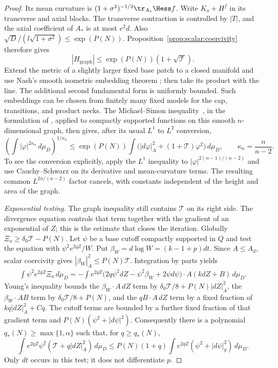 \begin{proof}
Its mean curvature is
$(1+\sigma^2)^{-1/2}\tr_{A_*}\Hess f$.  Write
$K_a+H^f$ in its transverse and axial blocks.  The transverse
contraction is controlled by $|T|$, and the axial coefficient of
$A_*$ is at most $e^2d$.  Also
$\sqrt D/(l\sqrt{1+\sigma^2})\le\exp(P(N))$.
Proposition~\ref{prop:scalar:coercivity} therefore gives
\[
 |H_{\mathrm{graph}}|\le\exp(P(N))(1+\sqrt{\mathcal T}).
\]
Extend the metric of a slightly larger fixed base patch to a closed
manifold and use Nash's smooth isometric embedding theorem
\cite{Nash1956}; then take its product with the line.  The additional second
fundamental form is uniformly bounded.  Such embeddings can be chosen
from finitely many fixed models for the cap, transitions, and product
necks. The Michael--Simon inequality~\cite{MichaelSimon1973}, in the
formulation of \cite[Chapter~4, Section~6, Theorem~6.7]{SimonGMT},
applied to compactly supported functions on this smooth $n$-dimensional graph,
then gives, after its usual $L^1$ to $L^2$ conversion,
\begin{equation}\label{eq:elliptic:graph-sobolev}
 \left(\int |\varphi|^{2\kappa_n}\,d\mu_D\right)^{1/\kappa_n}
 \le\exp(P(N))\int
       \bigl(|d\varphi|_A^2+(1+\mathcal T)\varphi^2\bigr)\,d\mu_D,
 \qquad \kappa_n=\frac n{n-2}.
\end{equation}
To see the conversion explicitly, apply the $L^1$ inequality to
$|\varphi|^{2(n-1)/(n-2)}$ and use Cauchy--Schwarz on its derivative
and mean-curvature terms.  The resulting common
$L^{2n/(n-2)}$ factor cancels, with constants independent of the
height and area of the graph.

\medskip\noindent\emph{Exponential testing.}
The graph inequality still contains $\mathcal T$ on its right side.
The divergence equation controls that term together with the gradient
of an exponential of $Z$; this is the estimate that closes the iteration.
Globally $\Xi_a\ge\delta_0\mathcal T-P(N)$.
Let $\psi$ be a base cutoff compactly supported in $Q$ and test the
equation with $\psi^2e^{2qZ}/W$.  Put
$\beta_W=d\log W=(k-1+p)dt$.
Since $A\le A_d$, scalar coercivity gives
$|\beta_W|_A^2\le P(N)\mathcal T$.
Integration by parts yields
\begin{align*}
 \int \psi^2e^{2qZ}\Xi_a\,d\mu_D
 =-\int e^{2qZ}
  \bigl(2q\psi^2dZ-\psi^2\beta_W+2\psi d\psi\bigr)
                   \cdot A(kdZ+B)\,d\mu_D.
\end{align*}
Young's inequality bounds the $\beta_W\cdot A\,dZ$ term by
$\delta_0\mathcal T/8+P(N)|dZ|_A^2$, the $\beta_W\cdot AB$
term by $\delta_0\mathcal T/8+P(N)$, and the $qB\cdot A\,dZ$
term by a fixed fraction of $kq|dZ|_A^2+C q$.
The cutoff terms are bounded by a further fixed fraction of that gradient
term and $P(N)(\psi^2+|d\psi|^2)$.
Consequently there is a polynomial $q_*(N)\ge\max\{1,\alpha\}$ such
that, for $q\ge q_*(N)$,
\begin{equation}\label{eq:elliptic:exponential-energy}
 \int e^{2qZ}\psi^2
           (\mathcal T+q|dZ|_A^2)\,d\mu_D
 \le P(N)(1+q)\int e^{2qZ}
                    (\psi^2+|d\psi|_g^2)\,d\mu_D.
\end{equation}
Only $dt$ occurs in this test; it does not differentiate $p$.


\end{proof}
